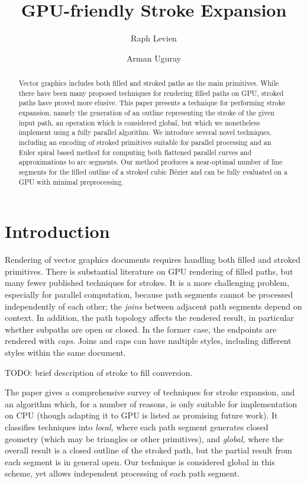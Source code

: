 \documentclass[format=acmsmall]{acmart}
\begin{document}
\title{GPU-friendly Stroke Expansion}
\author{Raph Levien}
\author{Arman Uguray}

\begin{abstract}
    Vector graphics includes both filled and stroked paths as the main primitives. While there have been many proposed techniques for rendering filled paths on GPU, stroked paths have proved more elusive. This paper presents a technique for performing stroke expansion, namely the generation of an outline representing the stroke of the given input path, an operation which is considered global, but which we nonetheless implement using a fully parallel algorithm. We introduce several novel techniques, including an encoding of stroked primitives suitable for parallel processing and an Euler spiral based method for computing both flattened parallel curves and approximations to arc segments. Our method produces a near-optimal number of line segments for the filled outline of a stroked cubic Bézier and can be fully evaluated on a GPU with minimal preprocessing.
\end{abstract}

\maketitle
\thispagestyle{empty}
\pagestyle{plain}

\section{Introduction}

Rendering of vector graphics documents requires handling both filled and stroked primitives. There is substantial literature on GPU rendering of filled paths, but many fewer published techniques for strokes. It is a more challenging problem, especially for parallel computation, because path segments cannot be processed independently of each other; the \emph{joins} between adjacent path segments depend on context. In addition, the path topology affects the rendered result, in particular whether subpaths are open or closed. In the former case, the endpoints are rendered with \emph{caps}. Joins and caps can have multiple styles, including different styles within the same document.

TODO: brief description of stroke to fill conversion.

The \cite{Nehab2020} paper gives a comprehensive survey of techniques for stroke expansion, and an algorithm which, for a number of reasons, is only suitable for implementation on CPU (though adapting it to GPU is listed as promising future work). It classifies techniques into \emph{local,} where each path segment generates closed geometry (which may be triangles or other primitives), and \emph{global,} where the overall result is a closed outline of the stroked path, but the partial result from each segment is in general open. Our technique is considered global in this scheme, yet allows independent processing of each path segment.
\end{document}
